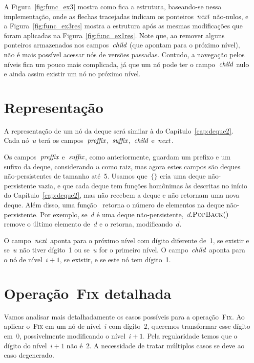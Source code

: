 \documentclass[../../main.tex]{subfiles}
\begin{document}
A Figura~\ref{fig:func_ex3} mostra como fica a estrutura, baseando-se nessa implementação, onde as flechas tracejadas indicam os ponteiros~$\mathit{next}$ não-nulos, e a Figura~\ref{fig:func_ex3res} mostra a estrutura após as mesmas modificações que foram aplicadas na Figura~\ref{fig:func_ex1res}. Note que, ao remover alguns ponteiros armazenados nos campos~$\mathit{child}$ (que apontam para o próximo nível), não é mais possível acessar nós de versões passadas. Contudo, a navegação pelos níveis fica um pouco mais complicada, já que um nó pode ter o campo~$\mathit{child}$ nulo e ainda assim existir um nó no próximo nível.

\section{Representação}

A representação de um nó da deque será similar à do Capítulo~\ref{cap:deque2}. Cada nó~$u$ terá os campos~$\mathit{preffix}$,~$\mathit{suffix}$,~$\mathit{child}$ e~$\mathit{next}$.

Os campos~$\mathit{preffix}$ e~$\mathit{suffix}$, como anteriormente, guardam um prefixo e um sufixo da deque, considerando $u$ como raiz, mas agora estes campos são deques não-persistentes de tamanho até~5. Usamos que~$\{\}$ cria uma deque não-persistente vazia, e que cada deque tem funções homônimas às descritas no início do Capítulo~\ref{cap:deque2}, mas não recebem a deque e não retornam uma nova deque. Além disso, uma função~ retorna o número de elementos na deque não-persistente. Por exemplo, se~$d$ é uma deque não-persistente,~$d.\mbox{\textsc{PopBack}$()$}$ remove o último elemento de~$d$ e o retorna, modificando~$d$.

O campo~$\mathit{next}$ aponta para o próximo nível com dígito diferente de~1, se existir e se~$u$ não tiver dígito~1 ou se~$u$ for o primeiro nível. O campo~$\mathit{child}$ aponta para o nó de nível~$i + 1$, se existir, e se este nó tem dígito~1.

\section{Operação~{\normalfont \textsc{Fix}} detalhada} \label{sec:fix_det}

Vamos analisar mais detalhadamente os casos possíveis para a operação~\textsc{Fix}. Ao aplicar o~\textsc{Fix} em um nó de nível~$i$ com dígito~2, queremos transformar esse dígito em~0, possivelmente modificando o nível~$i+1$. Pela regularidade temos que o dígito do nível~$i+1$ não é~2. A necessidade de tratar múltiplos casos se deve ao caso degenerado.
\end{document}
